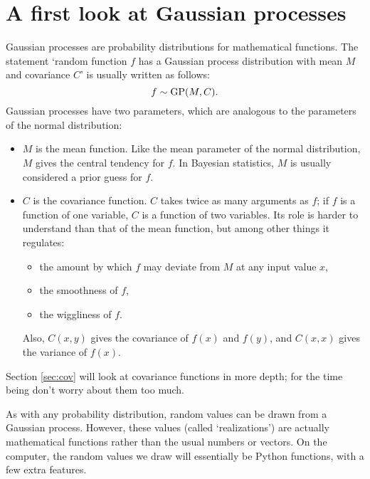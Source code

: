 \documentclass{manual}
\begin{document}
\section{A first look at Gaussian processes}\label{sec:firstlook}

Gaussian processes are probability distributions for mathematical functions. The statement `random function $f$ has a Gaussian process distribution with mean $M$ and covariance $C$' is usually written as follows:
\begin{equation}
    f\sim\textup{GP}(M,C).
\end{equation}
Gaussian processes have two parameters, which are analogous to the parameters of the normal distribution:
\begin{itemize}
    \item $M$ is the mean function. Like the mean parameter of the normal distribution, $M$ gives the central tendency for $f$. In Bayesian statistics, $M$ is usually considered a prior guess for $f$.
    \item $C$ is the covariance function. $C$ takes twice as many arguments as $f$; if $f$ is a function of one variable, $C$ is a function of two variables. Its role is harder to understand than that of the mean function, but among other things it regulates:
    \begin{itemize}
        \item the amount by which $f$ may deviate from $M$ at any input value $x$,
        \item the smoothness of $f$,
        \item the wiggliness of $f$.
    \end{itemize}
Also, $C(x,y)$ gives the covariance of $f(x)$ and $f(y)$, and $C(x,x)$ gives the variance of $f(x)$.
\end{itemize}
Section \ref{sec:cov} will look at covariance functions in more depth; for the time being don't worry about them too much.

As with any probability distribution, random values can be drawn from a Gaussian process. However, these values (called `realizations') are actually mathematical functions rather than the usual numbers or vectors. On the computer, the random values we draw will essentially be Python functions, with a few extra features.
\end{document}
